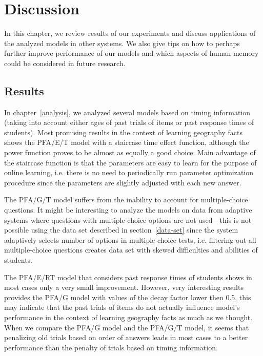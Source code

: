 \chapter{Discussion}

In this chapter, we review results of our experiments and discuss applications of the analyzed models in other systems. We also give tips on how to perhaps further improve performance of our models and which aspects of human memory could be considered in future research.

\section{Results}

In chapter~\ref{analysis}, we analyzed several models based on timing information (taking into account either ages of past trials of items or past response times of students). Most promising results in the context of learning geography facts shows the PFA/E/T model with a staircase time effect function, although the power function proves to be almost as equally a good choice. Main advantage of the staircase function is that the parameters are easy to learn for the purpose of online learning, i.e. there is no need to periodically run parameter optimization procedure since the parameters are slightly adjusted with each new answer.

The PFA/G/T model suffers from the inability to account for multiple-choice questions. It might be interesting to analyze the models on data from adaptive systems where questions with multiple-choice options are not used---this is not possible using the data set described in section~\ref{data-set} since the system adaptively selects number of options in multiple choice tests, i.e. filtering out all multiple-choice questions creates data set with skewed difficulties and abilities of students.

The PFA/E/RT model that considers past response times of students shows in most cases only a very small improvement. However, very interesting results provides the PFA/G model with values of the decay factor lower then 0.5, this may indicate that the past trials of items do not actually influence model's performance in the context of learning geography facts as much as we thought. When we compare the PFA/G model and the PFA/G/T model, it seems that penalizing old trials based on order of answers leads in most cases to a better performance than the penalty of trials based on timing information.

